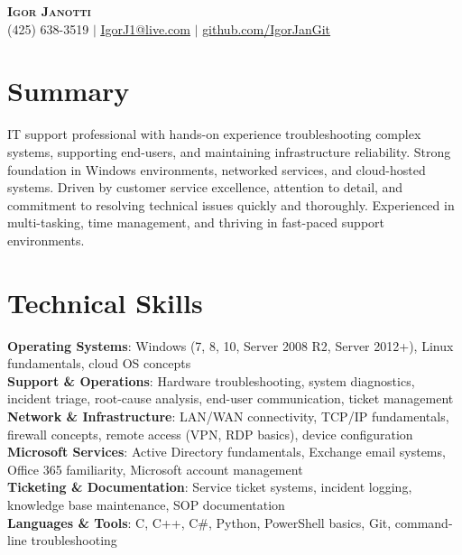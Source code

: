 \documentclass[letterpaper,11pt]{article}
\begin{document}
\begin{center}
    \textbf{\Huge \scshape Igor Janotti} \\ \vspace{1pt}
    \small (425) 638-3519 $|$ \href{mailto:IgorJ1@live.com}{\underline{IgorJ1@live.com}} $|$
    \href{https://github.com/IgorJanGit}{\underline{github.com/IgorJanGit}}
\end{center}

\section{Summary}
\small{IT support professional with hands-on experience troubleshooting complex systems, supporting end-users, and maintaining infrastructure reliability. Strong foundation in Windows environments, networked services, and cloud-hosted systems. Driven by customer service excellence, attention to detail, and commitment to resolving technical issues quickly and thoroughly. Experienced in multi-tasking, time management, and thriving in fast-paced support environments.}

\section{Technical Skills}
\begin{itemize}[leftmargin=0.15in, label={}]
  \small{\item{
    \textbf{Operating Systems}{: Windows (7, 8, 10, Server 2008 R2, Server 2012+), Linux fundamentals, cloud OS concepts} \\
    \textbf{Support \& Operations}{: Hardware troubleshooting, system diagnostics, incident triage, root-cause analysis, end-user communication, ticket management} \\
    \textbf{Network \& Infrastructure}{: LAN/WAN connectivity, TCP/IP fundamentals, firewall concepts, remote access (VPN, RDP basics), device configuration} \\
    \textbf{Microsoft Services}{: Active Directory fundamentals, Exchange email systems, Office 365 familiarity, Microsoft account management} \\
    \textbf{Ticketing \& Documentation}{: Service ticket systems, incident logging, knowledge base maintenance, SOP documentation} \\
    \textbf{Languages \& Tools}{: C, C++, C\#, Python, PowerShell basics, Git, command-line troubleshooting}
  }}
\end{itemize}
\end{document}
